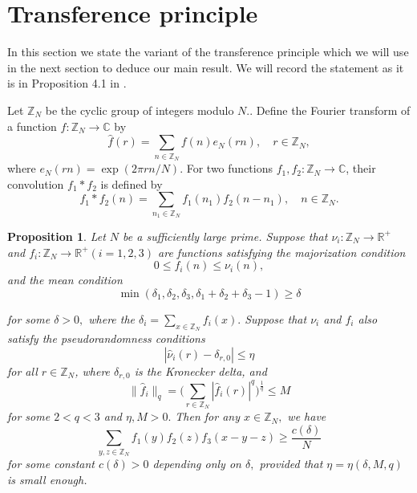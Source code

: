 \documentclass[a4paper,11pt,twoside]{amsart}
\newtheorem{proposition}[theorem]{Proposition}
\theoremstyle{definition}
\numberwithin{equation}{section}
\newcommand\R{\mathbb{R}}
\newcommand\Z{\mathbb{Z}}
\newcommand\C{\mathbb{C}}
\newcommand{\wh}{\widehat}
\begin{document}
\section{Transference principle }\label{sec4}
In this section we state the variant of the transference principle which we will use in the next section to deduce our main result. We will record the statement as it is in Proposition 4.1 in \cite{Shao}.


Let $\Z_N$ be the cyclic group of integers modulo $N.$. Define the Fourier transform of a function $f: \Z_N\rightarrow \C$ by
$$ \wh{f}(r) = \sum_{n \in \Z_N} f(n) e_N(rn), \quad r \in \Z_N,$$ where $e_N(rn) = \exp(2\pi rn/N ).$ 
For two functions $f_1,f_2:\Z_N\rightarrow\C$, their convolution $f_1*f_2$ is defined by
$$ f_1*f_2(n) = \sum_{n_1 \in \Z_N} f_1(n_1) f_2(n-n_1), \quad n \in \Z_N.$$

\begin{proposition}\label{transference}
Let $N$ be a sufficiently large prime. Suppose that $\nu_i: \Z_N \rightarrow \R^+$ and $f_i : \Z_N \rightarrow \R^+ (i = 1,2,3)$ are functions satisfying the majorization condition \begin{equation} \label{majorant}
    0 \leq f_i(n) \leq \nu_i(n),
\end{equation}
and the mean condition \begin{equation} \label{mean}
    \min(\delta_1,\delta_2,\delta_3,\delta_1 +\delta_2 + \delta_3-1) \geq \delta
\end{equation}

for some $\delta > 0,$ where the $\delta_i = \sum_{x \in \Z_N}f_i(x).$ Suppose that $\nu_i$ and $f_i$ also satisfy the pseudorandomness conditions \begin{equation} \label{decay}
    |\hat{\nu}_i(r) - \delta_{r,0}| \leq \eta 
\end{equation} for all $r \in \Z_N$, where $\delta_{r,0}$ is the Kronecker delta, and \begin{equation} \label{meanvalue}
    \|\hat{f}_i\|_q = \Big(\sum_{r \in \Z_N}|\hat{f}_i(r)|^q\Big)^{\frac{1}{q}} \leq M
\end{equation}
for some $2 < q < 3$ and $\eta, M > 0.$ Then for any $x \in \Z_N,$ we have \begin{equation}
    \sum_{y,z \in \Z_N}f_1(y)f_2(z)f_3(x-y-z) \geq \frac{c(\delta)}{N}
\end{equation}
for some constant $c(\delta) > 0$ depending only on $\delta,$ provided that $\eta = \eta(\delta,M,q)$ is small enough.

\end{proposition}
\end{document}
